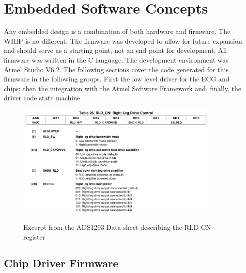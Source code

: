 \chapter{Embedded Software Concepts}
\label{chap:SensorConcepts}
Any embedded design is a combination of both hardware and firmware. The WHIP is no different. The firmware was developed to allow for future expansion and should serve as a starting point, not an end point for development. All firmware was written in the C language. The development environment was Atmel Studio V6.2\cite{AtmelStudio}. The following sections cover the code generated for this firmware in the following groups. First the low level driver for the ECG and  chips; then the integration with the Atmel Software Framework and, finally, the driver code state machine

\begin{figure}
	\begin{center}
		\label{fig:ADS1293_RLD_CN}
		\includegraphics[scale=1,width=0.9\textwidth]{Images/ADS1293_RLD_CN.png} 
		\caption{Excerpt from the ADS1293 Data sheet describing the RLD CN register}
	\end{center}
\end{figure}

\section{Chip Driver Firmware}

